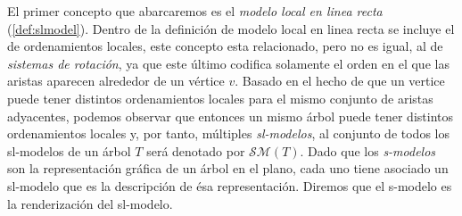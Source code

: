 El primer concepto que abarcaremos es el \textit{modelo local en linea recta} (\ref{def:slmodel}). Dentro de la definición de modelo local en linea recta se incluye el de ordenamientos locales, este concepto esta relacionado, pero no es igual, al de \textit{sistemas de rotaci\'on}, ya que este \'ultimo codifica solamente el orden en el que las aristas aparecen alrededor de un v\'ertice $v$. Basado en el hecho de que un vertice puede tener distintos ordenamientos locales para el mismo conjunto de aristas adyacentes, podemos observar que entonces un mismo árbol puede tener distintos ordenamientos locales y, por tanto, múltiples \textit{sl-modelos}, al conjunto de todos los sl-modelos de un árbol $T$ será denotado por $\mathcal{SM}(T)$. Dado que los \textit{s-modelos} son la representación gráfica de un árbol en el plano, cada uno tiene asociado un sl-modelo que es la descripción de ésa representación. Diremos que el s-modelo es la renderización del sl-modelo.

